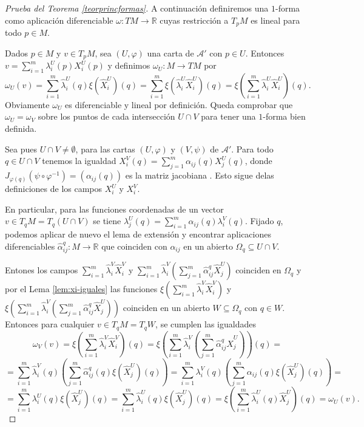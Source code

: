 \documentclass[\main/VD_completo.tex]{subfiles}
\begin{document}
\begin{proof}[Prueba del Teorema \ref{teorprincformas}]
A continuación definiremos una $1$-forma como aplicación diferenciable $\omega: TM \to \mathbb{R}$ cuyas restricción a $T_p M$ es lineal para todo $p\in M$.

Dados $p\in M$ y $v\in T_pM$, sea  $(U,\varphi)$ una carta de $\mathcal{A}'$ con $p\in U$. Entonces $v = \sum_{i=1}^m \lambda^U_i(p) X^U_i(p)$ y definimos $\omega_U: M \to TM$ por   
  \[
  \omega_U(v) = \sum_{i=1}^m \widehat{\lambda}^U_i(q) \xi(\widehat{X}^U_i) (q) = \sum_{i=1}^m \xi(\widehat{\lambda}^U_i \widehat{X}^U_i)(q) = \xi(\sum_{i=1}^m \widehat{\lambda}^U_i \widehat{X}^U_i)(q) .   
  \]
Obviamente $\omega_U$ es diferenciable y lineal por definición. Queda comprobar que $\omega_U = \omega_V$ sobre los puntos de cada intersección $U\cap V$ para tener una $1$-forma bien definida. 

Sea pues $U\cap V\neq \emptyset$, para las cartas $(U,\varphi)$ y $(V,\psi)$ de $\mathcal{A}'$. Para todo $q\in U\cap V$ tenemos la igualdad $X^V_i(q) = \sum_{j=1}^m \alpha_{ij}(q) X^U_j(q)$, donde $J_{\varphi(q)}(\psi\circ \varphi^{-1}) = (\alpha_{ij}(q))$ es la matriz jacobiana  . Esto sigue delas definiciones de los campos $X^U_i$ y $X^V_i$. 

En particular, para las funciones coordenadas de un vector $v\in T_q M = T_q (U\cap V)$ se tiene 
$\lambda^U_j(q) = \sum_{i=1}^m \alpha_{ij}(q) \lambda^V_i(q)$. Fijado $q$,  podemos aplicar de nuevo el lema de extensión y encontrar aplicaciones diferenciables $\widehat{\alpha}^q_{ij}: M  \to  \mathbb{R}$ 
que coinciden con $\alpha_{ij}$ en un abierto $\Omega_q \subseteq U\cap V$.   

Entones los campos $\sum_{i= 1}^m \widehat{\lambda}^V_i \widehat{X}^V_i$ y $\sum_{i= 1}^m \widehat{\lambda}^V_i(\sum_{j=1}^m \widehat {\alpha}^q_{ij}\widehat{X}^U_j)$ coinciden en $\Omega_q$ y por el Lema \ref{lem:xi-iguales} las funciones $\xi(\sum_{i=1}^m\widehat{\lambda}^V_i\widehat{X}^V_i)$ y $\xi(\sum_{i= 1}^m \widehat{\lambda}^V_i(\sum_{j=1}^m \widehat {\alpha}^q_{ij}\widehat{X}^U_j))$ coinciden en un abierto $W\subseteq \Omega_q$ con $q\in W$. Entonces para cualquier $v\in T_q M = T_qW$, se cumplen las igualdades
\[
\omega_V(v) = \xi(\sum_{i=1}^m\widehat{\lambda}^V_i\widehat{X}^V_i)(q) = \xi(\sum_{i= 1}^m \widehat{\lambda}^V_i(\sum_{j=1}^m \widehat {\alpha}^q_{ij}\widehat{X}^U_j))(q) =
\]
\[ = \sum_{i= 1}^m \widehat{\lambda}^V_i(q)(\sum_{j=1}^m \widehat{\alpha}^q_{ij}(q)\xi(\widehat{X}^U_j)(q))
= \sum_{i= 1}^m \lambda^V_i(q)(\sum_{j=1}^m \alpha_{ij}(q) \xi(\widehat{X}^U_j)(q)) =
\]
\[= \sum_{i=1}^m \lambda^U_i(q) \xi(\widehat{X}^U_j)(q) = \sum_{i=1}^m \widehat{\lambda}^U_i(q) \xi(\widehat{X}^U_j)(q) = \xi(\sum_{i=1}^m \widehat{\lambda}^U_i(q) \widehat{X}^U_j)(q) = \omega_U(v).
\]
\end{proof}
\end{document}
